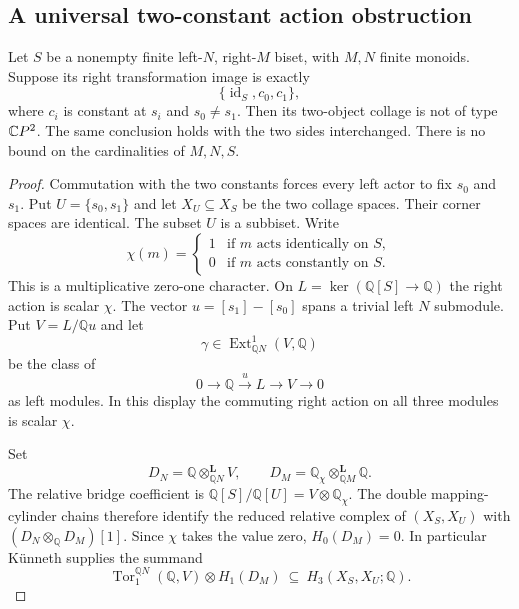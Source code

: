 \subsection{A universal two-constant action obstruction}

\begin{theorem}
\label{CP2:A-two-constant-image}
Let $S$ be a nonempty finite left-$N$, right-$M$ biset, with
$M,N$ finite monoids. Suppose its right transformation image is
exactly
\[
\{\operatorname{id}_S,c_0,c_1\},
\]
where $c_i$ is constant at $s_i$ and $s_0\ne s_1$.
Then its two-object collage is not of type $\mathbb{C}P^2$.
The same conclusion holds with the two sides interchanged.
There is no bound on the cardinalities of $M,N,S$.
\end{theorem}
\begin{proof}
Commutation with the two constants forces every left actor to
fix $s_0$ and $s_1$. Put $U=\{s_0,s_1\}$ and let $X_U\subseteq X_S$
be the two collage spaces. Their corner spaces are identical.
The subset $U$ is a subbiset. Write
\[
\chi(m)=\begin{cases}1&\text{if $m$ acts identically on $S$},\\
0&\text{if $m$ acts constantly on $S$}.
\end{cases}
\]
This is a multiplicative zero-one character. On
$L=\ker(\mathbb Q[S]\to\mathbb Q)$ the right action is scalar
$\chi$. The vector $u=[s_1]-[s_0]$ spans a trivial left
$N$ submodule. Put $V=L/\mathbb Qu$ and let
\[
\gamma\in\operatorname{Ext}^1_{\mathbb QN}(V,\mathbb Q)
\]
be the class of
\begin{equation}\label{CP2:A-two-constant-extension}
0\longrightarrow\mathbb Q\xrightarrow{\,u\,}L
\longrightarrow V\longrightarrow0
\end{equation}
as left modules. In this display the commuting right action
on all three modules is scalar $\chi$.

Set
\[
D_N=\mathbb Q\mathbin{\otimes^{\mathbf L}_{\mathbb QN}}V,
\qquad
D_M=\mathbb Q_\chi\mathbin{\otimes^{\mathbf L}_{\mathbb QM}}\mathbb Q.
\]
The relative bridge coefficient is
$\mathbb Q[S]/\mathbb Q[U]=V\otimes\mathbb Q_\chi$.
The double mapping-cylinder chains therefore identify the
reduced relative complex of $(X_S,X_U)$ with
$(D_N\otimes_{\mathbb Q}D_M)[1]$.
Since $\chi$ takes the value zero, $H_0(D_M)=0$.
In particular K\"unneth supplies the summand
\[
\operatorname{Tor}^{\mathbb QN}_1(\mathbb Q,V)
\otimes H_1(D_M)
\ \subseteq\ H_3(X_S,X_U;\mathbb Q).
\]


\end{proof}
